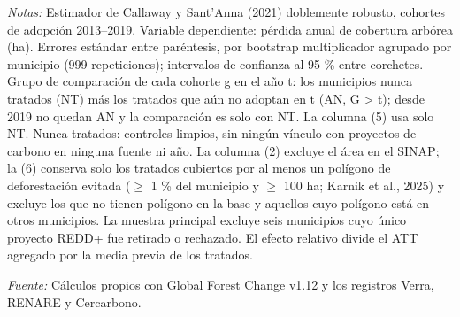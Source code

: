 \begin{table}[htbp]
\begin{threeparttable}
\begin{tablenotes}[flushleft]
\item \textit{Notas:} Estimador de Callaway y Sant’Anna (2021) doblemente robusto, cohortes de adopción 2013--2019. Variable dependiente: pérdida anual de cobertura arbórea (ha). Errores estándar entre paréntesis, por bootstrap multiplicador agrupado por municipio (999 repeticiones); intervalos de confianza al 95 \% entre corchetes. Grupo de comparación de cada cohorte g en el año t: los municipios nunca tratados (NT) más los tratados que aún no adoptan en t (AN, G > t); desde 2019 no quedan AN y la comparación es solo con NT. La columna (5) usa solo NT. Nunca tratados: controles limpios, sin ningún vínculo con proyectos de carbono en ninguna fuente ni año. La columna (2) excluye el área en el SINAP; la (6) conserva solo los tratados cubiertos por al menos un polígono de deforestación evitada ($\geq$ 1 \% del municipio y $\geq$ 100 ha; Karnik et al., 2025) y excluye los que no tienen polígono en la base y aquellos cuyo polígono está en otros municipios. La muestra principal excluye seis municipios cuyo único proyecto REDD+ fue retirado o rechazado. El efecto relativo divide el ATT agregado por la media previa de los tratados.
\item \textit{Fuente:} Cálculos propios con Global Forest Change v1.12 y los registros Verra, RENARE y Cercarbono.
\end{tablenotes}
\end{threeparttable}
\end{table}
